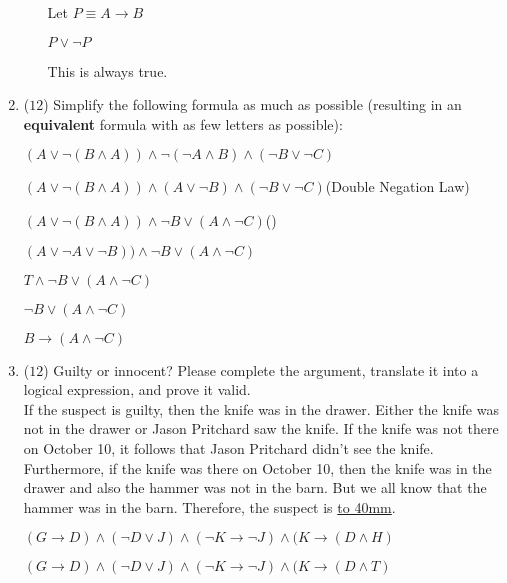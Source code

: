\documentclass[12pt]{article}
\begin{document}
\begin{enumerate}
\begin{enumerate}
Let $P \equiv A \to B$

$P \lor \lnot P$

This is always true.

\clearpage
\end{enumerate}

\item ($12$)
Simplify the following formula as much as possible (resulting in an \textbf{equivalent} formula with as few letters as possible):

 $(A \lor \lnot (B \land A)) \land \lnot(\lnot A \land B) \land (\lnot B \lor \lnot C)$

$(A \lor \lnot (B \land A)) \land  (A \lor \lnot B) \land (\lnot B \lor \lnot C)$\hfill(Double Negation Law)

$(A \lor \lnot (B \land A)) \land  \lnot B \lor (A \land \lnot C)$\hfill()

$(A \lor \lnot A\lor \lnot B)) \land  \lnot B \lor (A \land \lnot C)$

$T \land  \lnot B \lor (A \land \lnot C)$

$\lnot B \lor (A \land \lnot C)$

$B \to (A \land \lnot C)$


\clearpage

\item ($12$)
Guilty or innocent? Please complete the argument, translate it into a logical expression, and prove it valid. \\

If the suspect is guilty, then the knife was in the drawer. Either the knife was not in the drawer or Jason Pritchard saw the knife. If the knife was not there on October 10, it follows that Jason Pritchard didn’t see the knife. Furthermore, if the knife was there on October 10, then the knife was in the drawer and also the hammer was not in the barn. But we all know that the hammer was in the barn. Therefore, the suspect is  \underline{\hbox to 40mm{}}.

$(G \to D) \land (\lnot D \lor J) \land (\lnot K \to \lnot J) \land (K \to (D \land H)$

$(G \to D) \land (\lnot D \lor J) \land (\lnot K \to \lnot J) \land (K \to (D \land T)$


\end{enumerate}
\end{document}
